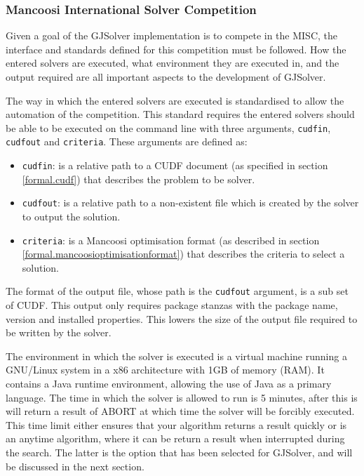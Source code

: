 \subsubsection{Mancoosi International Solver Competition}
Given a goal of the GJSolver implementation is to compete in the MISC, the interface and standards defined for this competition must be followed.
How the entered solvers are executed, what environment they are executed in, and the output required are all important aspects to the development of GJSolver.

The way in which the entered solvers are executed is standardised to allow the automation of the competition.
This standard requires the entered solvers should be able to be executed on the command line with three arguments, \verb+cudfin+, \verb+cudfout+ and \verb+criteria+.
These arguments are defined as:
\begin{itemize}
  \item \verb+cudfin+: is a relative path to a CUDF document (as specified in section \ref{formal.cudf}) that describes the problem to be solver.
  \item \verb+cudfout+: is a relative path to a non-existent file which is created by the solver to output the solution.
  \item \verb+criteria+: is a Mancoosi optimisation format (as described in section \ref{formal.mancoosioptimisationformat}) that describes the criteria to select a solution. 
\end{itemize}
The format of the output file, whose path is the \verb+cudfout+ argument, is a sub set of CUDF.
This output only requires package stanzas with the package name, version and installed properties.
This lowers the size of the output file required to be written by the solver.

The environment in which the solver is executed is a virtual machine running a GNU/Linux system in a x86 architecture with 1GB of memory (RAM).
It contains a Java runtime environment, allowing the use of Java as a primary language.
The time in which the solver is allowed to run is 5 minutes, after this is will return a result of ABORT at which time the solver will be forcibly executed.
This time limit either ensures that your algorithm returns a result quickly or is an anytime algorithm, where it can be return a result when interrupted during the search.
The latter is the option that has been selected for GJSolver, and will be discussed in the next section.

